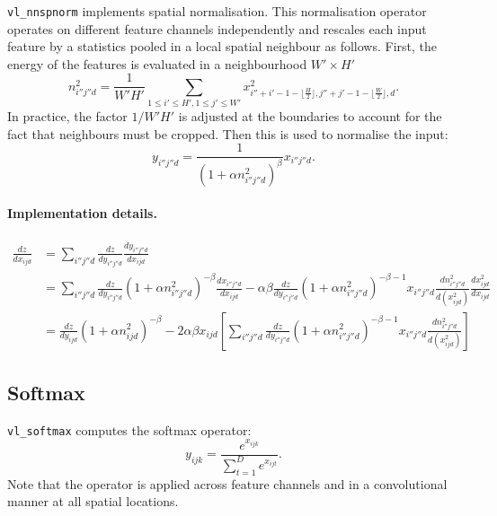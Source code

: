 \documentclass[12pt]{article}
\begin{document}
\verb!vl_nnspnorm! implements spatial normalisation. This normalisation operator operates on different feature channels independently and rescales each input feature by a statistics pooled in a local spatial neighbour as follows. First, the energy of the features is evaluated in a neighbourhood $W'\times H'$
\[
n_{i''j''d}^2 = \frac{1}{W'H'}
\sum_{1\leq i' \leq H', 1 \leq j' \leq W'} x^2_{
i''+i'-1-\lfloor \frac{H}{2}\rfloor,
j''+j'-1-\lfloor \frac{W}{2}\rfloor,
d}.
\]
In practice, the factor $1/W'H'$ is adjusted at the boundaries to account for the fact that neighbours must be cropped. Then this is used to normalise the input:
\[
y_{i''j''d} = \frac{1}{(1 + \alpha n_{i''j''d}^2)^\beta} x_{i''j''d}.
\]

\paragraph{Implementation details.}
\begin{align*}
\frac{dz}{dx_{ijd}} 
&= \sum_{i''j''d}
\frac{dz}{d y_{i''j''d}} 
\frac{d y_{i''j''d}}{d x_{ijd}}
\\
&=
\sum_{i''j''d}
\frac{dz}{d y_{i''j''d}} 
(1 + \alpha n_{i''j''d}^2)^{-\beta}
\frac{dx_{i''j''d}}{d x_{ijd}} 
-\alpha\beta
\frac{dz}{d y_{i''j''d}} 
(1 + \alpha n_{i''j''d}^2)^{-\beta-1}
x_{i''j''d}
\frac{dn_{i''j''d}^2}{d (x^2_{ijd})} 
\frac{dx^2_{ijd}}{d x_{ijd}}
\\
&=
\frac{dz}{d y_{ijd}} 
(1 + \alpha n_{ijd}^2)^{-\beta}
-2\alpha\beta x_{ijd}
\left[
\sum_{i''j''d}
\frac{dz}{d y_{i''j''d}} 
(1 + \alpha n_{i''j''d}^2)^{-\beta-1}
x_{i''j''d}
\frac{dn_{i''j''d}^2}{d (x_{ijd}^2)}
\right]
\end{align*}


\subsection{Softmax}\label{s:softmax}

\verb!vl_softmax! computes the softmax operator:
\[
 y_{ijk} = \frac{e^{x_{ijk}}}{\sum_{t=1}^D e^{x_{ijt}}}.
\]
Note that the operator is applied across feature channels and in a convolutional manner at all spatial locations.
\end{document}

